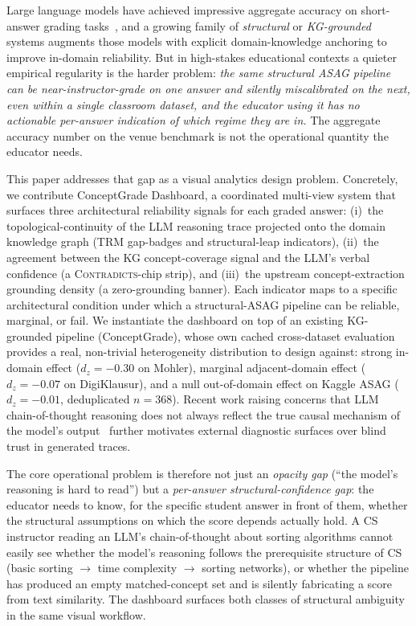 \documentclass[journal,review]{vgtc}
\begin{document}
Large language models have achieved impressive aggregate accuracy on
short-answer grading tasks~\cite{Liu2024,Wei2023_GEVAL}, and a growing
family of \emph{structural} or \emph{KG-grounded} systems augments
those models with explicit domain-knowledge anchoring to improve
in-domain reliability. But in high-stakes educational contexts a
quieter empirical regularity is the harder problem: \emph{the same
structural ASAG pipeline can be near-instructor-grade on one
answer and silently miscalibrated on the next, even within a single
classroom dataset, and the educator using it has no actionable
per-answer indication of which regime they are in.} The aggregate
accuracy number on the venue benchmark is not the operational
quantity the educator needs.

This paper addresses that gap as a visual analytics design problem.
Concretely, we contribute ConceptGrade Dashboard, a coordinated
multi-view system that surfaces three architectural reliability signals
for each graded answer: (i)~the topological-continuity of the LLM
reasoning trace projected onto the domain knowledge graph (TRM
gap-badges and structural-leap indicators), (ii)~the agreement between
the KG concept-coverage signal and the LLM's verbal confidence (a
\textsc{Contradicts}-chip strip), and (iii)~the upstream concept-extraction
grounding density (a zero-grounding banner). Each indicator maps to a
specific architectural condition under which a structural-ASAG
pipeline can be reliable, marginal, or fail. We instantiate the
dashboard on top of an existing KG-grounded pipeline (ConceptGrade),
whose own cached cross-dataset evaluation provides a real, non-trivial
heterogeneity distribution to design against: strong in-domain effect
($d_z = -0.30$ on Mohler), marginal adjacent-domain effect
($d_z = -0.07$ on DigiKlausur), and a null out-of-domain effect on
Kaggle ASAG ($d_z = -0.01$, deduplicated $n=368$). Recent work raising concerns that LLM
chain-of-thought reasoning does not always reflect the true causal
mechanism of the model's
output~\cite{Turpin2023,Lanham2023} further motivates external
diagnostic surfaces over blind trust in generated traces.

The core operational problem is therefore not just an
\textit{opacity gap} (``the model's reasoning is hard to read'') but a
\textit{per-answer structural-confidence gap}: the educator needs to
know, for the specific student answer in front of them, whether the
structural assumptions on which the score depends actually hold. A
CS instructor reading an LLM's chain-of-thought about sorting
algorithms cannot easily see whether the model's reasoning follows
the prerequisite structure of CS (basic sorting $\rightarrow$ time complexity
$\rightarrow$ sorting networks), or whether the pipeline has produced an
empty matched-concept set and is silently fabricating a score from
text similarity. The dashboard surfaces both classes of structural
ambiguity in the same visual workflow.
\end{document}
